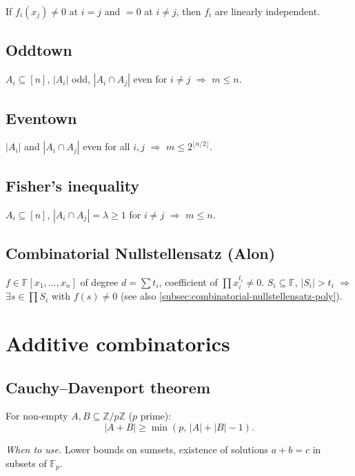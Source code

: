 If $f_i(x_j)\ne 0$ at $i=j$ and $=0$ at $i\ne j$, then $f_i$ are linearly independent.

\subsection{Oddtown}
\label{subsec:oddtown}

$A_i\subseteq[n]$, $|A_i|$ odd, $|A_i\cap A_j|$ even for $i\ne j$ $\Rightarrow$ $m\le n$.

\subsection{Eventown}
\label{subsec:eventown}

$|A_i|$ and $|A_i\cap A_j|$ even for all $i,j$ $\Rightarrow$ $m\le 2^{\lfloor n/2\rfloor}$.

\subsection{Fisher's inequality}
\label{subsec:fisher}

$A_i\subseteq[n]$, $|A_i\cap A_j|=\lambda\ge 1$ for $i\ne j$ $\Rightarrow$ $m\le n$.

\subsection{Combinatorial Nullstellensatz (Alon)}
\label{subsec:combinatorial-nullstellensatz-comb}

$f\in\mathbb{F}[x_1,\dots,x_n]$ of degree $d=\sum t_i$, coefficient of $\prod x_i^{t_i}\ne 0$. $S_i\subseteq\mathbb{F}$, $|S_i|>t_i$ $\Rightarrow$ $\exists s\in\prod S_i$ with $f(s)\ne 0$ (see also \ref{subsec:combinatorial-nullstellensatz-poly}).

\medskip

\section{Additive combinatorics}
\label{sec:additive-combinatorics}

\subsection{Cauchy--Davenport theorem}
\label{subsec:cauchy-davenport}

For non-empty $A,B\subseteq\mathbb{Z}/p\mathbb{Z}$ ($p$ prime):
$$|A+B|\ge\min(p,\,|A|+|B|-1).$$

\textit{When to use.} Lower bounds on sumsets, existence of solutions $a+b=c$ in subsets of $\mathbb{F}_p$.

